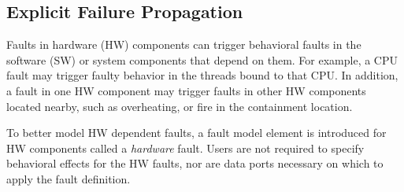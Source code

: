 \subsection{Explicit Failure Propagation} 
Faults in hardware (HW) components can trigger behavioral faults in the software (SW) or system components that depend on them. For example, a CPU fault may trigger faulty behavior in the threads bound to that CPU. In addition, a fault in one HW component may trigger faults in other HW components located nearby, such as overheating, or fire in the containment location. %

To better model HW dependent faults, a fault model element is introduced for HW components called a \textit{hardware} fault. Users are not required to specify behavioral effects for the HW faults, nor are data ports necessary on which to apply the fault definition. 

